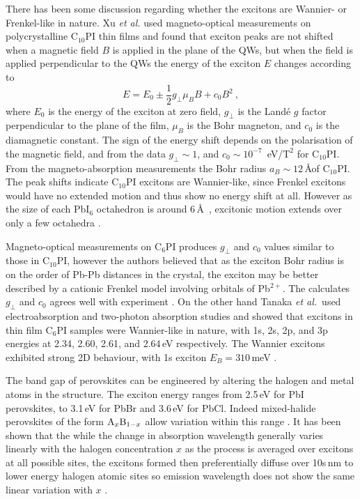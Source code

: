 There has been some discussion regarding whether the excitons are Wannier- or Frenkel-like in nature. Xu \textit{et al.} used magneto-optical measurements on polycrystalline $\textrm{C}_{10}$PI thin films and found that exciton peaks are not shifted when a magnetic field $B$ is applied in the plane of the QWs, but when the field is applied perpendicular to the QWs the energy of the exciton $E$ changes according to
\begin{equation}
E = E_0 \pm \frac{1}{2} g_{\bot} \mu_{B} B + c_0 B^2~,
\label{mag-shift}
\end{equation} 
where $E_0$ is the energy of the exciton at zero field, $g_{\bot}$ is the Land\'{e} $g$ factor perpendicular to the plane of the film, $\mu_B$ is the Bohr magneton, and $c_0$ is the diamagnetic constant. The sign of the energy shift depends on the polarisation of the magnetic field, and from the data $g_{\bot}\sim1$, and $c_0\sim 10^{-7}$~eV/$\textrm{T}^2$ for C$_{10}$PI. From the magneto-absorption measurements the Bohr radius $a_B \sim12\,$\AA of $\textrm{C}_{10}$PI. The peak shifts indicate $\textrm{C}_{10}$PI excitons are Wannier-like, since Frenkel excitons would have no extended motion and thus show no energy shift at all. However as the size of each $\textrm{PbI}_6$ octahedron is around 6\,\AA~\cite{Ishihara1990}, excitonic motion extends over only a few octahedra \cite{Xu1991b}.

Magneto-optical measurements on C$_6$PI produces $g_{\bot}$ and $c_0$ values similar to those in $\textrm{C}_{10}$PI, however the authors believed that as the exciton Bohr radius is on the order of Pb-Pb distances in the crystal, the exciton may be better described by a cationic Frenkel model involving orbitals of Pb$^{2+}$. The calculates $g_{\bot}$ and $c_0$ agrees well with experiment \cite{Kataoka1993}. On the other hand Tanaka \textit{et al.}\ used electroabsorption and two-photon absorption studies and showed that excitons in thin film $\textrm{C}_{6}$PI samples were Wannier-like in nature, with 1s, 2s, 2p, and 3p energies at 2.34, 2.60, 2.61, and 2.64\,eV respectively. The Wannier excitons exhibited strong 2D behaviour, with 1s exciton $E_B = 310$\,meV \cite{Tanaka2002}.

The band gap of perovskites can be engineered by altering the halogen and metal atoms in the structure. The exciton energy ranges from 2.5\,eV for PbI perovskites, to 3.1\,eV for PbBr and 3.6\,eV for PbCl. Indeed mixed-halide perovskites of the form $\textnormal{A}_x\textnormal{B}_{1-x}$ allow variation within this range \cite{Kitazawa1996, Kitazawa1997}. It has been shown that the while the change in absorption wavelength generally varies linearly with the halogen concentration $x$ as the process is averaged over excitons at all possible sites, the excitons formed then preferentially diffuse over 10s\,nm to lower energy halogen atomic sites so emission wavelength does not show the same linear variation with $x$ \cite{Ahmad2013}.


